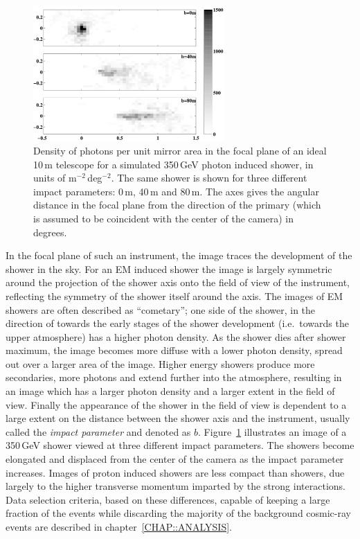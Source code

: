 \begin{figure}[t]
\centerline{\includegraphics[angle=270,width=0.65\textwidth]{plots/chap-technique/fplane_density.pdf}}
\caption{\label{FIG::TECHNIQUE::FPDENSITY} Density of photons per 
unit mirror area in the focal plane of an ideal 10\,m telescope for a
simulated 350\,GeV photon induced shower, in units of
m$^{-2}$\,deg$^{-2}$. The same shower is shown for three different
impact parameters: 0\,m, 40\,m and 80\,m. The axes gives the angular
distance in the focal plane from the direction of the primary (which
is assumed to be coincident with the center of the camera) in
degrees.}
\end{figure}

In the focal plane of such an instrument, the image traces the
development of the shower in the sky. For an EM induced shower the
image is largely symmetric around the projection of the shower axis
onto the field of view of the instrument, reflecting the symmetry of
the shower itself around the axis. The images of EM showers are often
described as ``cometary''; one side of the shower, in the direction of
towards the early stages of the shower development (i.e.\ towards the
upper atmosphere) has a higher photon density. As the shower dies
after shower maximum, the image becomes more diffuse with a lower
photon density, spread out over a larger area of the image.  Higher
energy showers produce more secondaries, more \Cerenkov photons and
extend further into the atmosphere, resulting in an image which has a
larger photon density and a larger extent in the field of view.
Finally the appearance of the shower in the field of view is dependent
to a large extent on the distance between the shower axis and the
instrument, usually called the \textit{impact parameter} and denoted
as $b$. Figure~\ref{FIG::TECHNIQUE::FPDENSITY} illustrates an image of
a 350\,GeV \Gray shower viewed at three different impact parameters.
The showers become elongated and displaced from the center of the
camera as the impact parameter increases. Images of proton induced
showers are less compact than \Gray showers, due largely to the higher
transverse momentum imparted by the strong interactions. Data
selection criteria, based on these differences, capable of keeping a
large fraction of the \Gray events while discarding the majority of
the background cosmic-ray events are described in
chapter~\ref{CHAP::ANALYSIS}.

